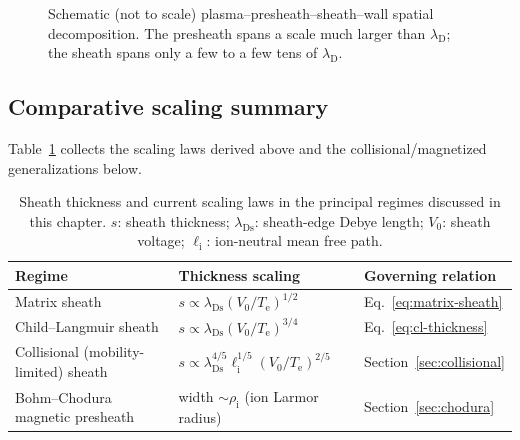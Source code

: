 \begin{figure}[htbp]
\centering
{}
\caption{Schematic (not to scale) plasma--presheath--sheath--wall spatial decomposition. The presheath spans a scale much larger than $\lambda_{\mathrm{D}}$; the sheath spans only a few to a few tens of $\lambda_{\mathrm{D}}$.}
\label{fig:sheath-regions}
\end{figure}

\subsection{Comparative scaling summary}

Table~\ref{tab:sheath-scaling} collects the scaling laws derived above and the collisional/magnetized generalizations below.

\begin{table}[htbp]
\centering
\caption{Sheath thickness and current scaling laws in the principal regimes discussed in this chapter. $s$: sheath thickness; $\lambda_{\mathrm{Ds}}$: sheath-edge Debye length; $V_{0}$: sheath voltage; $\ell_{\mathrm{i}}$: ion-neutral mean free path.}
\label{tab:sheath-scaling}
\begin{tabular}{lll}
\toprule
Regime & Thickness scaling & Governing relation \\
\midrule
Matrix sheath & $s \propto \lambda_{\mathrm{Ds}} (V_{0}/T_{\mathrm{e}})^{1/2}$ & Eq.~\eqref{eq:matrix-sheath} \\
Child--Langmuir sheath & $s \propto \lambda_{\mathrm{Ds}} (V_{0}/T_{\mathrm{e}})^{3/4}$ & Eq.~\eqref{eq:cl-thickness} \\
Collisional (mobility-limited) sheath & $s \propto \lambda_{\mathrm{Ds}}^{4/5} \ell_{\mathrm{i}}^{1/5} (V_{0}/T_{\mathrm{e}})^{2/5}$ & Section~\ref{sec:collisional} \\
Bohm--Chodura magnetic presheath & width $\sim \rho_{\mathrm{i}}$ (ion Larmor radius) & Section~\ref{sec:chodura} \\
\bottomrule
\end{tabular}
\end{table}


